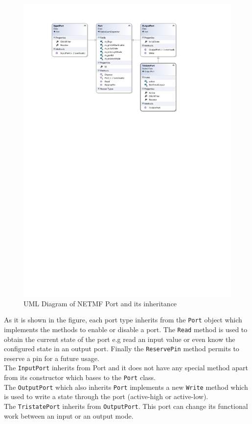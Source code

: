 \begin{figure}[H]\begin{center}
 \centering
  \captionsetup{justification=centering}
  \includegraphics[width=1\textwidth]{pictures/iosharp/gpio}
  \caption{UML Diagram of NETMF Port and its inheritance \label{fig:gpio-uml}}
\end{center}\end{figure}

As it is shown in the figure, each port type inherits from the \verb!Port! object which implements the methods to enable or disable a port. The \verb!Read! method is used to obtain the current state of the port e.g read an input value or even know the configured state in an output port. Finally the \verb!ReservePin! method permits to reserve a pin for a future usage.
\\
The \verb!InputPort! inherits from Port and it does not have any special method apart from its constructor which bases to the \verb!Port! class. 
\\
The \verb!OutputPort! which also inherits \verb!Port! implements a new \verb!Write! method which is used to write a state through the port (active-high or active-low).
\\
The \verb!TristatePort! inherits from \verb!OutputPort!. This port can change its functional work between an input or an output mode.

